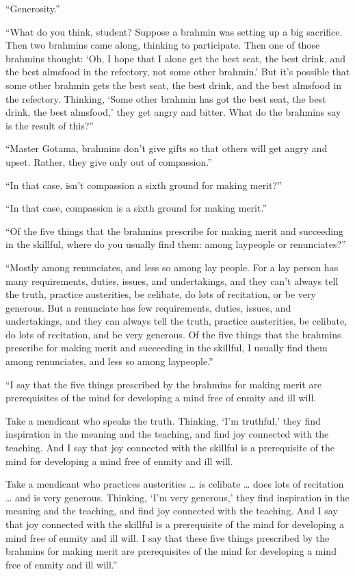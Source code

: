 \documentclass[12pt,openany]{book}%
\begin{document}
“Generosity.” 

“What do you think, student? Suppose a brahmin was setting up a big sacrifice. Then two brahmins came along, thinking to participate. Then one of those brahmins thought: ‘Oh, I hope that I alone get the best seat, the best drink, and the best almsfood in the refectory, not some other brahmin.’ But it’s possible that some other brahmin gets the best seat, the best drink, and the best almsfood in the refectory. Thinking, ‘Some other brahmin has got the best seat, the best drink, the best almsfood,’ they get angry and bitter. What do the brahmins say is the result of this?” 

“Master Gotama, brahmins don’t give gifts so that others will get angry and upset. Rather, they give only out of compassion.” 

“In that case, isn’t compassion a sixth ground for making merit?” 

“In that case, compassion is a sixth ground for making merit.” 

“Of the five things that the brahmins prescribe for making merit and succeeding in the skillful, where do you usually find them: among laypeople or renunciates?” 

“Mostly among renunciates, and less so among lay people. For a lay person has many requirements, duties, issues, and undertakings, and they can’t always tell the truth, practice austerities, be celibate, do lots of recitation, or be very generous. But a renunciate has few requirements, duties, issues, and undertakings, and they can always tell the truth, practice austerities, be celibate, do lots of recitation, and be very generous. Of the five things that the brahmins prescribe for making merit and succeeding in the skillful, I usually find them among renunciates, and less so among laypeople.” 

“I say that the five things prescribed by the brahmins for making merit are prerequisites of the mind for developing a mind free of enmity and ill will. 

Take a mendicant who speaks the truth. Thinking, ‘I’m truthful,’ they find inspiration in the meaning and the teaching, and find joy connected with the teaching. And I say that joy connected with the skillful is a prerequisite of the mind for developing a mind free of enmity and ill will. 

Take a mendicant who practices austerities … is celibate … does lots of recitation … and is very generous. Thinking, ‘I’m very generous,’ they find inspiration in the meaning and the teaching, and find joy connected with the teaching. And I say that joy connected with the skillful is a prerequisite of the mind for developing a mind free of enmity and ill will. I say that these five things prescribed by the brahmins for making merit are prerequisites of the mind for developing a mind free of enmity and ill will.” 
\end{document}
